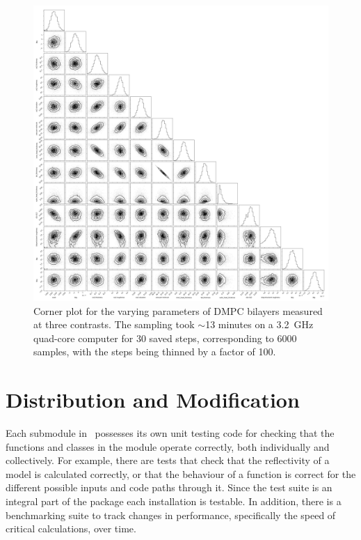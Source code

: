 \documentclass[pdf,preprint]{iucr}
\begin{document}
\begin{figure}
  \includegraphics[width=175mm]{./supporting_information/corner.png}
  \caption{Corner plot for the varying parameters of DMPC bilayers measured at three contrasts. The sampling took $\sim$13 minutes on a \SI{3.2}{GHz} quad-core computer for 30 saved steps, corresponding to 6000 samples, with the steps being thinned by a factor of 100.}
  \label{fig:corner}
\end{figure}

 
\section{Distribution and Modification}

Each submodule in \ possesses its own unit testing code for checking that the functions and classes in the module operate correctly, both individually and collectively. For example, there are tests that check that the reflectivity of a model is calculated correctly, or that the behaviour of a function is correct for the different possible inputs and code paths through it. Since the test suite is an integral part of the package each installation is testable. In addition, there is a benchmarking suite to track changes in performance, specifically the speed of critical calculations, over time.
 
\end{document}

